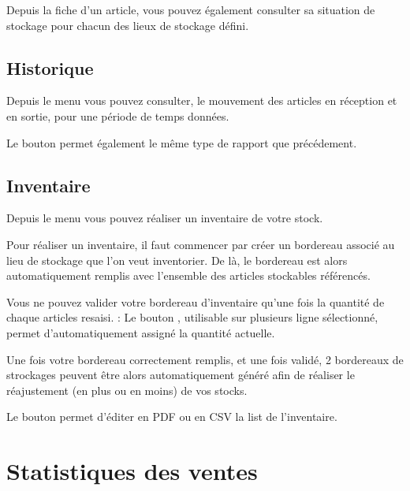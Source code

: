 \documentclass[a4paper,10pt,oneside,french]{sphinxmanual}
\begin{document}
\sphinxAtStartPar
Depuis la fiche d’un article, vous pouvez également consulter sa situation de stockage pour chacun des lieux de stockage défini.


\subsection{Historique}
\label{\detokenize{invoice/stock:historique}}
\sphinxAtStartPar
Depuis le menu  vous pouvez consulter, le mouvement des articles en réception et en sortie, pour une période de temps données.

\sphinxAtStartPar
Le bouton  permet également le même type de rapport que précédement.


\subsection{Inventaire}
\label{\detokenize{invoice/stock:inventaire}}
\sphinxAtStartPar
Depuis le menu  vous pouvez réaliser un inventaire de votre stock.

\sphinxAtStartPar
Pour réaliser un inventaire, il faut commencer par créer un bordereau associé au lieu de stockage que l’on veut inventorier.
De là, le bordereau est alors automatiquement remplis avec l’ensemble des articles stockables référencés.

\sphinxAtStartPar
Vous ne pouvez valider votre bordereau d’inventaire qu’une fois la quantité de chaque articles resaisi.
 : Le bouton , utilisable sur plusieurs ligne sélectionné, permet d’automatiquement assigné la quantité actuelle.

\sphinxAtStartPar
Une fois votre bordereau correctement remplis, et une fois validé, 2 bordereaux de strockages peuvent être alors automatiquement généré afin de réaliser le réajustement (en plus ou en moins) de vos stocks.

\sphinxAtStartPar
Le bouton  permet d’éditer en PDF ou en CSV la list de l’inventaire.


\section{Statistiques des ventes}
\label{\detokenize{invoice/statistics:statistiques-des-ventes}}\label{\detokenize{invoice/statistics::doc}}
\noindent{}
\end{document}
